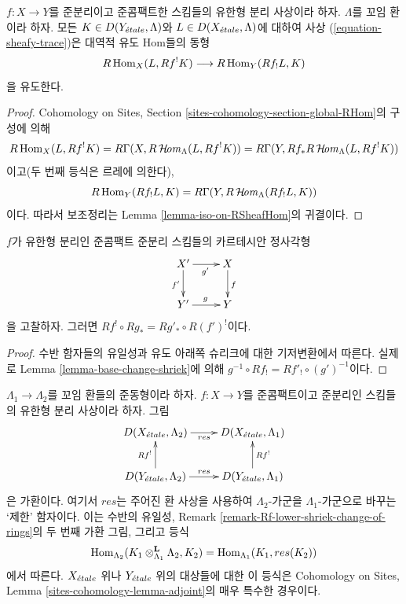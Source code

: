 \begin{lemma}
\label{lemma-iso-global-hom}
$f : X \to Y$를 준분리이고 준콤팩트한 스킴들의 유한형 분리 사상이라
하자. $\Lambda$를 꼬임 환이라 하자. 모든
$K \in D(Y_{\acute{e}tale}, \Lambda)$와 $L \in D(X_{\acute{e}tale}, \Lambda)$에 대하여
사상 (\ref{equation-sheafy-trace})은 대역적 유도 Hom들의 동형
$$
R\mathop{\mathrm{Hom}}\nolimits_X(L, Rf^!K) \longrightarrow R\mathop{\mathrm{Hom}}\nolimits_Y(Rf_!L, K)
$$
을 유도한다.
\end{lemma}

\begin{proof}
Cohomology on Sites, Section
\ref{sites-cohomology-section-global-RHom}의 구성에 의해
$$
R\mathop{\mathrm{Hom}}\nolimits_X(L, Rf^!K) =
R\Gamma(X, R\mathop{\mathcal{H}\!\mathit{om}}\nolimits_\Lambda(L, Rf^!K)) =
R\Gamma(Y, Rf_*R\mathop{\mathcal{H}\!\mathit{om}}\nolimits_\Lambda(L, Rf^!K))
$$
이고(두 번째 등식은 르레에 의한다),
$$
R\mathop{\mathrm{Hom}}\nolimits_Y(Rf_!L, K) = R\Gamma(Y, R\mathop{\mathcal{H}\!\mathit{om}}\nolimits_\Lambda(Rf_!L, K))
$$
이다. 따라서 보조정리는 Lemma
\ref{lemma-iso-on-RSheafHom}의 귀결이다.
\end{proof}

\begin{lemma}
\label{lemma-cartesian-square-Rf-upper-shriek}
$f$가 유한형 분리인 준콤팩트 준분리 스킴들의 카르테시안 정사각형
$$
\xymatrix{
X' \ar[r]_{g'} \ar[d]_{f'} & X \ar[d]^f \\
Y' \ar[r]^g & Y
}
$$
을 고찰하자. 그러면 $Rf^! \circ Rg_* = Rg'_* \circ R(f')^!$이다.
\end{lemma}

\begin{proof}
수반 함자들의 유일성과 유도 아래쪽 슈리크에 대한 기저변환에서
따른다. 실제로 Lemma \ref{lemma-base-change-shriek}에 의해
$g^{-1} \circ Rf_! = Rf'_! \circ (g')^{-1}$이다.
\end{proof}

\begin{remark}
\label{remark-Rf-upper-shriek-change-of-rings}
$\Lambda_1 \to \Lambda_2$를 꼬임 환들의 준동형이라 하자.
$f : X \to Y$를 준콤팩트이고 준분리인 스킴들의 유한형 분리 사상이라
하자. 그림
$$
\xymatrix{
D(X_\etale, \Lambda_2) \ar[r]_{res} &
D(X_\etale, \Lambda_1) \\
D(Y_\etale, \Lambda_2) \ar[r]^{res} \ar[u]^{Rf^!} &
D(Y_\etale, \Lambda_1) \ar[u]_{Rf^!}
}
$$
은 가환이다. 여기서 $res$는 주어진 환 사상을 사용하여
$\Lambda_2$-가군을 $\Lambda_1$-가군으로 바꾸는 ‘제한’ 함자이다.
이는 수반의 유일성, Remark
\ref{remark-Rf-lower-shriek-change-of-rings}의 두 번째 가환 그림,
그리고 등식
$$
\mathop{\mathrm{Hom}}\nolimits_{\Lambda_2}(K_1 \otimes_{\Lambda_1}^\mathbf{L} \Lambda_2, K_2) =
\mathop{\mathrm{Hom}}\nolimits_{\Lambda_1}(K_1, res(K_2))
$$
에서 따른다.
$X_{\acute{e}tale}$ 위나 $Y_{\acute{e}tale}$ 위의 대상들에 대한 이 등식은
Cohomology on Sites, Lemma
\ref{sites-cohomology-lemma-adjoint}의 매우 특수한 경우이다.
\end{remark}


